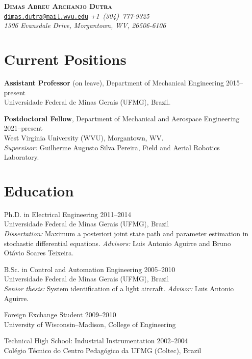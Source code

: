 \documentclass[letterpaper, 11pt, oneside]{memoir}
\begin{document}
\thispagestyle{plain}

\begin{center}
  {
    \LARGE \bfseries \scshape 
    Dimas Abreu Archanjo Dutra
  }
  \\[1ex]
  \small
  \texttt{\href{mailto:dimas.dutra@mail.wvu.edu}{dimas.dutra@mail.wvu.edu}}
  \itshape\qquad
  +1~(304)~777-9325
  \\
  1306 Evansdale Drive, Morgantown, WV, 26506-6106
\end{center}

\section{Current Positions}

\begin{description}
\item \textbf{Assistant Professor} (on leave), 
  Department of Mechanical Engineering
  \hfill 2015--present
  \\
  Universidade Federal de Minas Gerais (UFMG), Brazil.

\item \textbf{Postdoctoral Fellow}, 
  Department of Mechanical and Aerospace Engineering
  \hfill 2021--present
  \\
  West Virginia University (WVU), Morgantown, WV. 
  \\
  \emph{Supervisor:} Guilherme Augusto Silva Pereira, 
  Field and Aerial Robotics Laboratory.
\end{description}

\section{Education}
\begin{description}
\item Ph.D. in Electrical Engineering \hfill 2011--2014
  \\
  Universidade Federal de Minas Gerais (UFMG), Brazil
  \\
  \emph{Dissertation:} Maximum a posteriori joint state path and
  parameter estimation in stochastic differential equations.
  \emph{Advisors:} Luis Antonio Aguirre and Bruno Otávio Soares Teixeira.

\item B.Sc. in Control and Automation Engineering
  \hfill 2005--2010
  \\
  Universidade Federal de Minas Gerais (UFMG), Brazil
  \\
  \textit{Senior thesis:} System identification of a light aircraft.
  \emph{Advisor:} Luis Antonio Aguirre.
\item Foreign Exchange Student \hfill 2009--2010
  \\
  University of Wisconsin--Madison, College of Engineering
\item Technical High School: Industrial Instrumentation \hfill 2002--2004
  \\
  Colégio Técnico do Centro Pedagógico da UFMG (Coltec), Brazil
\end{description}
\end{document}

